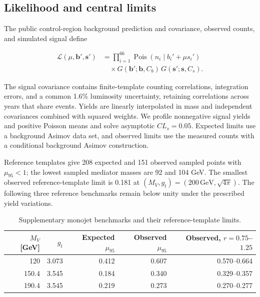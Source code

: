 \subsection{Likelihood and central limits}
\label{sec:monojet_results}

The public control-region background prediction and covariance, observed counts, and simulated signal define

\begin{equation}
\label{eq:likelihood}
\begin{aligned}
\mathcal L(\mu,\mathbf b',\mathbf s') &=
\prod_{i=1}^{66}\operatorname{Pois}(n_i\mid b_i'+\mu s_i')\\
&\quad\times G(\mathbf b';\mathbf b,C_b)\,G(\mathbf s';\mathbf s,C_s).
\end{aligned}
\end{equation}

The signal covariance contains finite-template counting correlations, integration errors, and a common 1.6\% luminosity uncertainty, retaining correlations across years that share events. Yields are linearly interpolated in mass and independent covariances combined with squared weights. We profile nonnegative signal yields and positive Poisson means and solve asymptotic $CL_s=0.05$. Expected limits use a background Asimov data set, and observed limits use the measured counts with a conditional background Asimov construction. \cite{cmscovariance,cmsyields,cmssimplified,cowan2011,read2002}

Reference templates give 208 expected and 151 observed sampled points with $\mu_{95}<1$; the lowest sampled mediator masses are 92 and 104 GeV. The smallest observed reference-template limit is 0.181 at $(M_V,g_t)=(200\,\mathrm{GeV},\sqrt{4\pi})$. The following three reference benchmarks remain below unity under the prescribed yield variations.

\begin{table}[tbp]
\caption{Supplementary monojet benchmarks and their reference-template limits.}
\label{tab:benchmarks}
\begin{ruledtabular}
\begin{tabular}{rrrrr}
$M_V$ [GeV] & $g_t$ & Expected $\mu_{95}$ & Observed $\mu_{95}$ & Observed, $r=0.75$--$1.25$ \\
\hline
120 & 3.073 & 0.412 & 0.607 & 0.570--0.664 \\
150.4 & 3.545 & 0.184 & 0.340 & 0.329--0.357 \\
190.4 & 3.545 & 0.219 & 0.273 & 0.270--0.277 \\
\end{tabular}
\end{ruledtabular}
\end{table}

